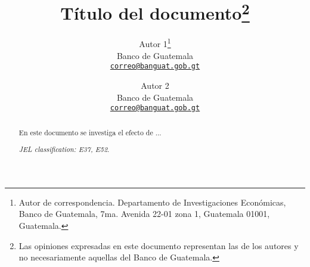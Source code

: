 \documentclass{diereport}
\title{Título del documento\footnote{Las opiniones expresadas en este documento representan las de los autores y no necesariamente aquellas del Banco de Guatemala.}}
\author{
  Autor 1\thanks{Autor de correspondencia. Departamento de Investigaciones Económicas, Banco de Guatemala, 7ma. Avenida 22-01 zona 1, Guatemala 01001, Guatemala.}\\
  {\small Banco de Guatemala
  }\\
  {\footnotesize\href{mailto:correo@banguat.gob.gt}{\texttt{correo@banguat.gob.gt}}}
  \and
  Autor 2\\
  {\small Banco de Guatemala}\\
  {\footnotesize\href{mailto:correo@banguat.gob.gt}{\texttt{correo@banguat.gob.gt}}}
}
\begin{document}
	
	\maketitle

	
	\begin{abstract}
	En este documento se investiga el efecto de ...
	\lipsum[10]

	\noindent \textit{JEL classification: E37, E52}.
	\end{abstract}
	
	

	

	
	
	
	
	
		
	

	\printbibliography
	
	\newpage
	
\end{document}
